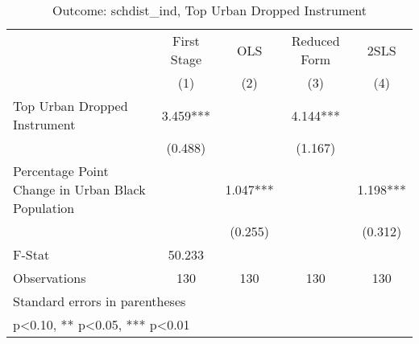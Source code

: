 \begin{table}[htbp]\centering
\def\sym#1{\ifmmode^{#1}\else\(^{#1}\)\fi}
\caption{Outcome: schdist\_ind, Top Urban Dropped Instrument}
\begin{tabular}{l*{4}{c}}
\toprule
                    & First Stage   &         OLS   &Reduced Form   &        2SLS   \\
                    &\multicolumn{1}{c}{(1)}   &\multicolumn{1}{c}{(2)}   &\multicolumn{1}{c}{(3)}   &\multicolumn{1}{c}{(4)}   \\
\midrule
Top Urban Dropped Instrument&       3.459***&               &       4.144***&               \\
                    &     (0.488)   &               &     (1.167)   &               \\
\addlinespace
Percentage Point Change in Urban Black Population&               &       1.047***&               &       1.198***\\
                    &               &     (0.255)   &               &     (0.312)   \\
\midrule
F-Stat              &      50.233   &               &               &               \\
Observations        &         130   &         130   &         130   &         130   \\
\bottomrule
\multicolumn{5}{l}{\footnotesize Standard errors in parentheses}\\
\multicolumn{5}{l}{\footnotesize * p<0.10, ** p<0.05, *** p<0.01}\\
\end{tabular}
\end{table}
